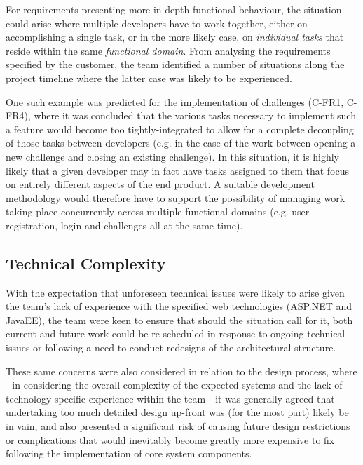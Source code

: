 For requirements presenting more in-depth functional behaviour, the situation could arise where multiple developers have to work together, either on accomplishing a single task, or in the more likely case, on \textit{individual tasks} that reside within the same \textit{functional domain}. From analysing the requirements specified by the customer, the team identified a number of situations along the project timeline where the latter case was likely to be experienced. 

One such example was predicted for the implementation of challenges (C-FR1, C-FR4), where it was concluded that the various tasks necessary to implement such a feature would become too tightly-integrated to allow for a complete decoupling of those tasks between developers (e.g. in the case of the work between opening a new challenge and closing an existing challenge). In this situation, it is highly likely that a given developer may in fact have tasks assigned to them that focus on entirely different aspects of the end product. A suitable development methodology would therefore have to support the possibility of managing work taking place concurrently across multiple functional domains (e.g. user registration, login and challenges all at the same time).

\subsection{Technical Complexity}

 With the expectation that unforeseen technical issues were likely to arise given the team's lack of experience   with the specified web technologies (ASP.NET and JavaEE), the team were keen to ensure that should the situation call for it, both current and future work could be re-scheduled in response to ongoing technical issues or following a need to conduct redesigns of the architectural structure. 
 
These same concerns were also considered in relation to the design process, where - in considering the overall complexity of the expected systems and the lack of technology-specific experience within the team - it was generally agreed that undertaking too much detailed design up-front was (for the most part) likely be in vain, and also presented a significant risk of causing future design restrictions or complications that would inevitably become greatly more expensive to fix following the implementation of core system components.

